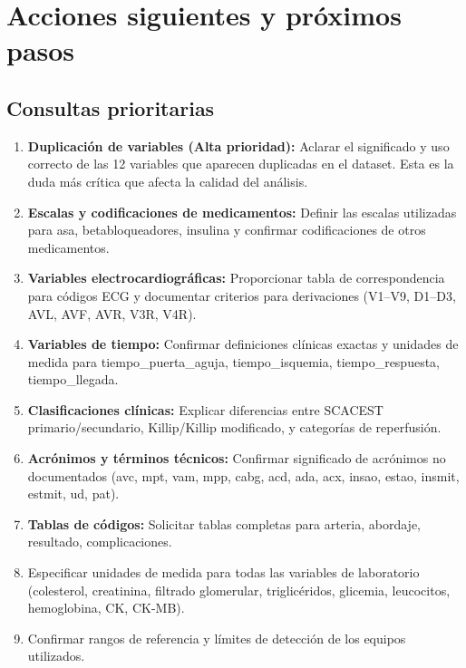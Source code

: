 \documentclass[11pt,a4paper]{article}
\begin{document}
\section*{Acciones siguientes y próximos pasos}

\subsection*{Consultas prioritarias }
\begin{enumerate}
    \item \textbf{Duplicación de variables (Alta prioridad):} Aclarar el significado y uso correcto de las 12 variables que aparecen duplicadas en el dataset. Esta es la duda más crítica que afecta la calidad del análisis.
    \item \textbf{Escalas y codificaciones de medicamentos:} Definir las escalas utilizadas para asa, betabloqueadores, insulina y confirmar codificaciones de otros medicamentos.
    \item \textbf{Variables electrocardiográficas:} Proporcionar tabla de correspondencia para códigos ECG y documentar criterios para derivaciones (V1--V9, D1--D3, AVL, AVF, AVR, V3R, V4R).
    \item \textbf{Variables de tiempo:} Confirmar definiciones clínicas exactas y unidades de medida para tiempo\_puerta\_aguja, tiempo\_isquemia, tiempo\_respuesta, tiempo\_llegada.
    \item \textbf{Clasificaciones clínicas:} Explicar diferencias entre SCACEST primario/secundario, Killip/Killip modificado, y categorías de reperfusión.
    \item \textbf{Acrónimos y términos técnicos:} Confirmar significado de acrónimos no documentados (avc, mpt, vam, mpp, cabg, acd, ada, acx, insao, estao, insmit, estmit, ud, pat).
    \item \textbf{Tablas de códigos:} Solicitar tablas completas para arteria, abordaje, resultado, complicaciones.
    \item Especificar unidades de medida para todas las variables de laboratorio (colesterol, creatinina, filtrado glomerular, triglicéridos, glicemia, leucocitos, hemoglobina, CK, CK-MB).
    \item Confirmar rangos de referencia y límites de detección de los equipos utilizados.
\end{enumerate}
\end{document}
